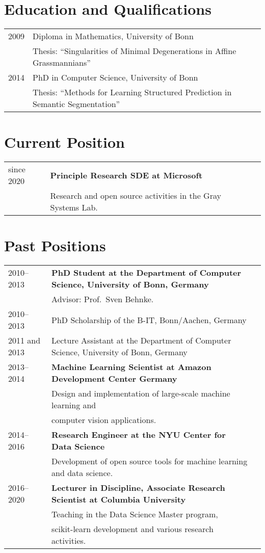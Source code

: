 \documentclass[a4paper,11pt]{article}
\begin{document}
\maketitle

\section{Education and Qualifications}
\begin{tabular}{lll}
    2009 & Diploma in Mathematics,  University of Bonn\\
         & Thesis: ``Singularities of Minimal Degenerations in Affine Grassmannians'' \\
    2014 & PhD in Computer Science, University of Bonn \\
         & Thesis: ``Methods for Learning Structured Prediction in Semantic Segmentation''
\end{tabular}

\section{Current Position}
\begin{tabular}{lll}
    since 2020 & \textbf{Principle Research SDE at Microsoft}\\
               & Research and open source activities in the Gray Systems Lab.
\end{tabular}

\section{Past Positions}
\begin{tabular}{lll}
    2010--2013 & \textbf{PhD Student at the Department of Computer Science, University of Bonn, Germany}\\
         & Advisor: Prof.\ Sven Behnke. \\
    2010--2013 & PhD Scholarship of the B-IT, Bonn/Aachen, Germany\\
    2011 and 2013& Lecture Assistant at the Department of Computer Science, University of Bonn, Germany \\
    2013--2014 & \textbf{Machine Learning Scientist at Amazon Development Center Germany}\\
              & Design and implementation of large-scale machine learning and\\
              & computer vision applications.\\
    2014--2016 & \textbf{Research Engineer at the NYU Center for Data Science}\\
               & Development of open source tools for machine learning and data science.\\
    2016--2020 & \textbf{Lecturer in Discipline, Associate Research Scientist at Columbia University}\\
               & Teaching in the Data Science Master program, \\
               & scikit-learn development and various research activities.
\end{tabular}
\end{document}
